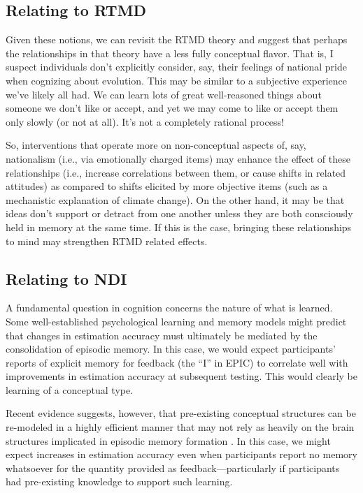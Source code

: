 \subsection{Relating to RTMD}

Given these notions, we can revisit the RTMD theory and suggest that perhaps the
relationships in that theory have a less fully conceptual flavor.  That is, I
suspect individuals don't explicitly consider, say, their feelings of national
pride when cognizing about evolution.  This may be similar to a subjective
experience we've likely all had. We can learn lots of great well-reasoned things
about someone we don't like or accept, and yet we may come to like or accept
them only slowly (or not at all). It's not a completely rational process!

So, interventions that operate more on non-conceptual aspects of, say,
nationalism (i.e., via emotionally charged items) may enhance the effect of
these relationships (i.e., increase correlations between them, or cause shifts in
related attitudes) as compared to shifts elicited by more objective items (such
as a mechanistic explanation of climate change).  On the other hand, it may be
that ideas don't support or detract from one another unless they are both
consciously held in memory at the same time. If this is the case, bringing these
relationships to mind may strengthen RTMD related effects.

\subsection{Relating to NDI}

A fundamental question in cognition concerns the nature of what is learned. Some
well-established psychological learning and memory models
\cite{nadel_memory_1997} might predict that changes in estimation accuracy must
ultimately be mediated by the consolidation of episodic memory. In this case, we
would expect participants' reports of explicit memory for feedback (the ``I'' in
EPIC) to correlate well with improvements in estimation accuracy at subsequent
testing.  This would clearly be learning of a conceptual type.

Recent evidence suggests, however, that pre-existing conceptual structures can
be re-modeled in a highly efficient manner that may not rely as heavily on the
brain structures implicated in episodic memory formation
\cite{tse_schemas_2007,clark_assembling_2003}. In this case, we might expect
increases in estimation accuracy even when participants report no memory
whatsoever for the quantity provided as feedback---particularly if participants
had pre-existing knowledge to support such learning.

